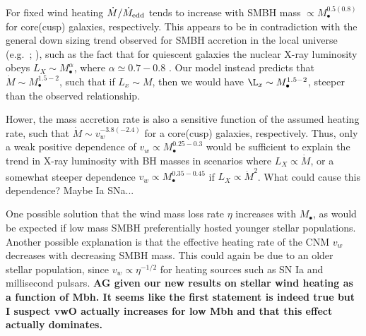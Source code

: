 \documentclass[usenatbib,fleqn]{mn2e}
\newcommand{\Mdot}{\dot{M}}
\newcommand{\eddr}{\dot{M}/\dot{M}_{\rm Edd}}
\newcommand{\Mbh}[1][]{M_{\bullet#1}}
\newcommand{\vwO}{v_{w}}
\begin{document}
For fixed wind heating $\dot{M}/\dot{M}_{\rm edd}$ tends to increase
with SMBH mass $\propto M_{\bullet}^{0.5(0.8)}$ for core(cusp)
galaxies, respectively.  This appears to be in contradiction with the
general down sizing trend observed for SMBH accretion in the local
universe (e.g.~\citealt{Heckman+04}; \citealt{Gallo+08}), such as the
fact that for quiescent galaxies the nuclear X-ray luminosity obeys
$L_X \sim \Mbh^\alpha$, where $\alpha\simeq 0.7-0.8$
\citep{Miller+15}.  Our model instead predicts that $\Mdot
\sim \Mbh^{1.5-2}$, such that if $L_x\sim M$, then we would have $\L_x
\sim \Mbh^{1.5-2}$, steeper than the observed relationship.

Hower, the mass accretion rate is also a sensitive function of the assumed heating rate, such that $\dot{M}\sim\vwO^{-3.8(-2.4)}$ for a core(cusp) galaxies, respectively.  Thus, only a weak positive dependence of $v_{w} \propto M_{\bullet}^{0.25-0.3}$ would be sufficient to explain the trend in X-ray luminosity with BH masses in scenarios where $L_X \propto \dot{M}$, or a somewhat steeper dependence $v_{w} \propto M_{\bullet}^{0.35-0.45}$ if $L_{X} \propto \dot{M}^{2}$.  What could cause this dependence?  Maybe Ia SNa...



One possible solution that the wind mass loss rate $\eta$ increases
with $\Mbh$, as would be expected if low mass SMBH preferentially
hosted younger stellar populations.  Another possible explanation is
that the effective heating rate of the CNM $v_{w}$ decreases
with decreasing SMBH mass.  This could again be due to an older
stellar population, since $v_{w} \propto \eta^{-1/2}$ for heating
sources such as SN Ia and millisecond pulsars.
{\bf AG given our new results on stellar wind heating as a function of
Mbh. It seems like the first statement is indeed true but I suspect
vwO actually increases for low Mbh and that this effect actually dominates.}
\end{document}
